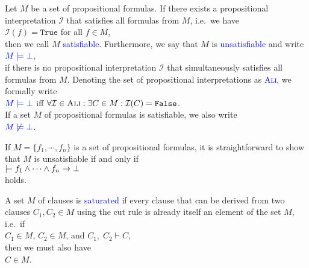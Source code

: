 \begin{Definition}[Satisfiability]  \hspace*{\fill} \linebreak
  Let $M$ be a set of propositional formulas.
  If there exists a propositional interpretation $\mathcal{I}$ that satisfies all formulas from $M$, i.e.~we have
  \\[0.2cm]
  \hspace*{1.3cm}
  $\mathcal{I}(f) = \texttt{True}$ \quad for all $f \in M$,
  \\[0.2cm]
  then we call $M$ \textcolor{blue}{satisfiable}.
  Furthermore, we say that $M$ is \textcolor{blue}{unsatisfiable}
  and write 
  \\[0.2cm]
  \hspace*{1.3cm}
  $\textcolor{blue}{M \models \bot}$, 
  \\[0.2cm]
  if there is no propositional interpretation $\mathcal{I}$ that simultaneously satisfies all formulas from $M$.
  Denoting the set of propositional interpretations as
  \textsc{\textcolor{blue}{Ali}}, we formally write
  \\[0.2cm]
  \hspace*{1.3cm}
  $\textcolor{blue}{M \models \bot}$ \quad iff \quad 
  $\forall \mathcal{I} \in \textsc{Ali}: \exists C \in M: \mathcal{I}(C) = \texttt{False}$.
  \\[0.2cm]
  If a set $M$ of propositional formulas is satisfiable, we also write
  \\[0.2cm]
  \hspace*{1.3cm}
  $\textcolor{blue}{M \not\models \bot}$.
  \eox
\end{Definition}

\remarkEng 
If $M = \{ f_1, \cdots, f_n \}$ is a set of propositional formulas, it is straightforward to show that
$M$ is unsatisfiable if and only if
\\[0.2cm]
\hspace*{1.3cm}
$\models f_1 \wedge \cdots \wedge f_n \rightarrow \bot$
\\[0.2cm]
holds. \eox

\begin{Definition} \hspace*{\fill} \linebreak
  A set $M$ of clauses is \textcolor{blue}{saturated}  if every clause that can be derived from two
  clauses $C_1, C_2 \in M$ using the cut rule is already itself an element of
  the set $M$, i.e.~if
  \\[0.2cm]
  \hspace*{1.3cm}
  $C_1 \in M$, \quad $C_2 \in M$, \quad and \quad $C_1,\; C_2 \vdash C$,
  \\[0.2cm]
  then we must also have 
  \\[0.2cm]
  \hspace*{1.3cm}
  $C \in M$.
\end{Definition}
 
